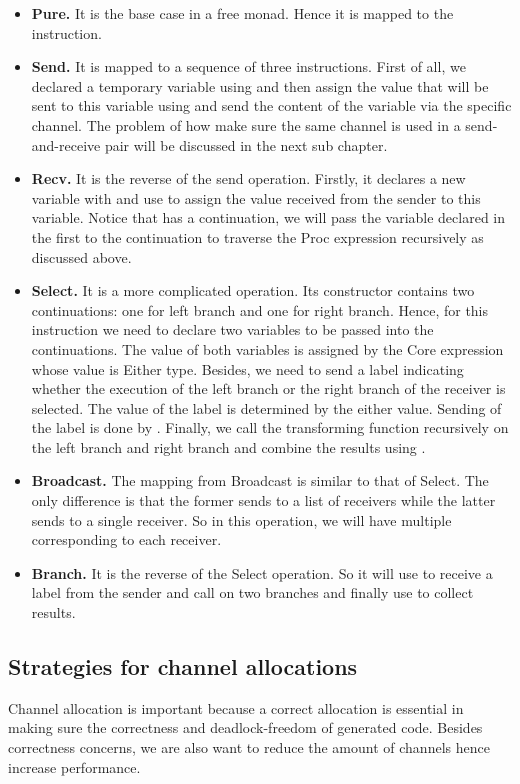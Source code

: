 \begin{itemize}
    \item \textbf{Pure. } It is the base case in a free monad. Hence it is mapped to the  instruction.
    \item \textbf{Send. } It is mapped to a sequence of three instructions. First of all, we declared a temporary variable using  and then assign the value that will be sent to this variable using  and send the content of the variable via the specific channel. The problem of how make sure the same channel is used in a send-and-receive pair will be discussed in the next sub chapter.
    \item \textbf{Recv. } It is the reverse of the send operation. Firstly, it declares a new variable with  and use  to assign the value received from the sender to this variable. Notice that  has a continuation, we will pass the variable declared in the first  to the continuation to traverse the Proc expression recursively as discussed above. 
    \item \textbf{Select. } It is a more complicated operation. Its constructor contains two continuations: one for left branch and one for right branch. Hence, for this instruction we need to declare two variables to be passed into the continuations. The value of both variables is assigned by the Core expression whose value is Either type. Besides, we need to send a label indicating whether the execution of the left branch or the right branch of the receiver is selected. The value of the label is determined by the either value. Sending of the label is done by . Finally, we call the transforming function recursively on the left branch and right branch and combine the results using .
    \item \textbf{Broadcast. } The mapping from Broadcast is similar to that of Select. The only difference is that the former sends to a list of receivers while the latter sends to a single receiver. So in this operation, we will have multiple  corresponding to each receiver.  
    \item \textbf{Branch. } It is the reverse of the Select operation. So it will use  to receive a label from the sender and call on two branches and finally use  to collect results.
\end{itemize}
\subsection{Strategies for channel allocations}
Channel allocation is important because a correct allocation is essential in making sure the correctness and deadlock-freedom of generated code. Besides correctness concerns, we are also want to reduce the amount of channels hence increase performance. 

